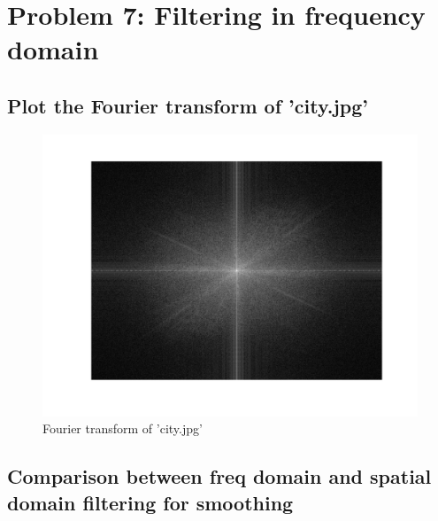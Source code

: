 \documentclass{article}
\begin{document}
	\newpage
	\section{Problem 7: Filtering in frequency domain}
	\subsection{Plot the Fourier transform of 'city.jpg'}
	\begin{figure}[H]
		\includegraphics[width=\linewidth]{Q7/partA.png}
		\caption{Fourier transform of 'city.jpg'}
	\end{figure}
	
	\subsection{Comparison between freq domain and spatial domain filtering for smoothing}
	
\end{document}
